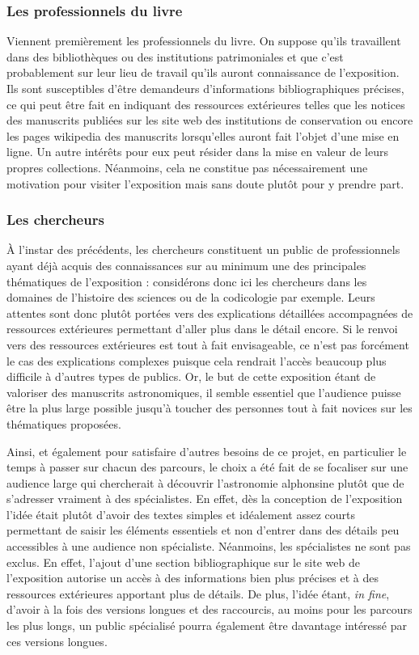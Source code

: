     \subsubsection{Les professionnels du livre}
    Viennent premièrement les professionnels du livre. On suppose qu’ils travaillent dans des bibliothèques ou des institutions patrimoniales et que c’est probablement sur leur lieu de travail qu’ils auront connaissance de l’exposition. Ils sont susceptibles d’être demandeurs d’informations bibliographiques précises, ce qui peut être fait en indiquant des ressources extérieures telles que les notices des manuscrits publiées sur les site web des institutions de conservation ou encore les pages wikipedia des manuscrits lorsqu’elles auront fait l’objet d’une mise en ligne. Un autre intérêts pour eux peut résider dans la mise en valeur de leurs propres collections. Néanmoins, cela ne constitue pas nécessairement une motivation pour visiter l’exposition mais sans doute plutôt pour y prendre part. 
 
    \subsubsection{Les chercheurs}
    À l’instar des précédents, les chercheurs constituent un public de professionnels ayant déjà acquis des connaissances sur au minimum une des principales thématiques de l’exposition : considérons donc ici les chercheurs dans les domaines de l’histoire des sciences ou de la codicologie par exemple. Leurs attentes sont donc plutôt portées vers des explications détaillées accompagnées de ressources extérieures permettant d’aller plus dans le détail encore. Si le renvoi vers des ressources extérieures est tout à fait envisageable, ce n’est pas forcément le cas des explications complexes puisque cela rendrait l’accès beaucoup plus difficile à d’autres types de publics. Or, le but de cette exposition étant de valoriser des manuscrits astronomiques, il semble essentiel que l’audience puisse être la plus large possible jusqu’à toucher des personnes tout à fait novices sur les thématiques proposées. 

    Ainsi, et également pour satisfaire d’autres besoins de ce projet, en particulier le temps à passer sur chacun des parcours, le choix a été fait de se focaliser sur une audience large qui chercherait à découvrir l’astronomie alphonsine plutôt que de s’adresser vraiment à des spécialistes. En effet, dès la conception de l’exposition l’idée était plutôt d’avoir des textes simples et idéalement assez courts permettant de saisir les éléments essentiels et non d’entrer dans des détails peu accessibles à une audience non spécialiste. Néanmoins, les spécialistes ne sont pas exclus. En effet, l’ajout d’une section bibliographique sur le site web de l’exposition autorise un accès à des informations bien plus précises et à des ressources extérieures apportant plus de détails. De plus, l’idée étant, \textit{in fine}, d’avoir à la fois des versions longues et des raccourcis, au moins pour les parcours les plus longs, un public spécialisé pourra également être davantage intéressé par ces versions longues.

